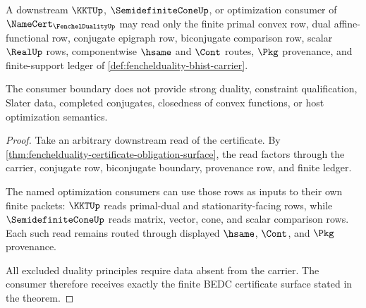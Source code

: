 \begin{theorem}
\label{thm:fenchelduality-downstream-consumer-boundary}
A downstream $\KKTUp$, $\SemidefiniteConeUp$, or optimization consumer of $\NameCert_{\FenchelDualityUp}$ may read only the finite primal convex row, dual affine-functional row, conjugate epigraph row, biconjugate comparison row, scalar $\RealUp$ rows, componentwise $\hsame$ and $\Cont$ routes, $\Pkg$ provenance, and finite-support ledger of \autoref{def:fenchelduality-bhist-carrier}.

The consumer boundary does not provide strong duality, constraint qualification, Slater data, completed conjugates, closedness of convex functions, or host optimization semantics.
\end{theorem}
\begin{proof}
Take an arbitrary downstream read of the certificate. By \autoref{thm:fenchelduality-certificate-obligation-surface}, the read factors through the carrier, conjugate row, biconjugate boundary, provenance row, and finite ledger.

The named optimization consumers can use those rows as inputs to their own finite packets: $\KKTUp$ reads primal-dual and stationarity-facing rows, while $\SemidefiniteConeUp$ reads matrix, vector, cone, and scalar comparison rows. Each such read remains routed through displayed $\hsame$, $\Cont$, and $\Pkg$ provenance.

All excluded duality principles require data absent from the carrier. The consumer therefore receives exactly the finite BEDC certificate surface stated in the theorem.
\end{proof}


\begin{closurestatus}{\FenchelDualityUp}
  \theoryclosure{\seedClosure}
  \formalstatus{\unformalizedV}
\end{closurestatus}
